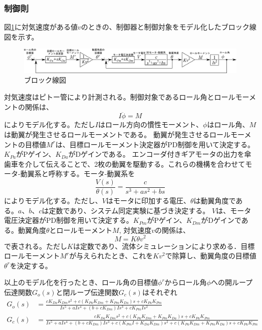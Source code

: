 \documentclass[a4paper,11pt,titlepage,uplatex]{jsarticle}
\begin{document}
\subsubsection{制御則}
図\ref{fig:ブロック線図}に対気速度がある値$v$のときの、制御器と制御対象をモデル化したブロック線図を示す。
\begin{figure}[H]
	\centering
	\includegraphics[width=0.95\linewidth]{pic_avi/block_diagram.png}
	\caption{ブロック線図}
	\label{fig:ブロック線図}
\end{figure}
対気速度はピトー管により計測される。制御対象であるロール角とロールモーメントの関係は、
\begin{equation}
	I\ddot\phi=M
\end{equation}
によりモデル化する。ただし$I$はロール方向の慣性モーメント、$\phi$はロール角、$M$は動翼が発生させるロールモーメントである。
動翼が発生させるロールモーメントの目標値$M^r$は、目標ロールモーメント決定器がPD制御を用いて決定する。$K_{Pa}$がPゲイン、$K_{Da}$がDゲインである。
エンコーダ付きギアモータの出力を傘歯車を介して伝えることで、2枚の動翼を駆動する。これらの機構を合わせてモータ-動翼系と呼称する。モータ-動翼系を
\begin{equation}
	\frac{V(s)}{\theta(s)}=\frac{c}{s^3+as^2+bs}
\end{equation}
によりモデル化する。ただし、$V$はモータに印加する電圧、$\theta$は動翼角度である。$a、b、c$は定数であり、システム同定実験に基づき決定する。
$V$は、モータ電圧決定器がPD制御を用いて決定する。$K_{Pm}$がPゲイン、$K_{Dm}$がDゲインである。動翼角度$\theta$とロールモーメント$M$, 対気速度$v$の関係は、
\begin{equation}
	M=K\theta v^2
\end{equation}
で表される。ただし$K$は定数であり、流体シミュレーションにより求める．目標ロールモーメント$M^r$が与えられたとき、これを$Kv^2$で除算し、動翼角度の目標値$θ^r$を決定する。\par
以上のモデル化を行ったとき、ロール角の目標値$\phi^r$からロール角$\phi$への開ループ伝達関数$G_o(s)$と閉ループ伝達関数$G_c(s)$はそれぞれ
\begin{equation}
	\begin{split}
		G_{o}(s)&=\frac{cK_{Da}K_{Dm}s^2+c\left(K_{Pa}K_{Dm}+K_{Pm}K_{Da}\right)s+cK_{Pa}K_{Pm}}{Is^5+aIs^4+\left(b+cK_{Dm}\right)Is^3+cK_{Pm}Is^2}\\
		G_{c}(s)&=\frac{cK_{Da}K_{Dm}s^2+c\left(K_{Pa}K_{Dm}+K_{Pm}K_{Da}\right)s+cK_{Pa}K_{Pm}}{Is^5+aIs^4+\left(b+cK_{Dm}\right)Is^3+c\left(K_{Pm}I+K_{Da}K_{Dm}\right)s^2+c(K_{Pa}K_{Dm}+K_{Pm}K_{Da})s+cK_{Pa}K_{Pm}}
	\end{split}
\end{equation}
\end{document}
